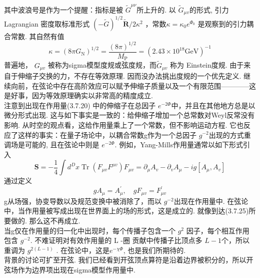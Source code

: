 其中波浪号是作为一个提醒：指标是被 $\tilde{G}^{\mu \nu}$所上升的. 以 $\tilde{G}_{\mu v}$的形式, 引力 Lagrangian 密度取标准形式  $(-\tilde{G})^{1 / 2} \tilde{\boldsymbol{R}} / 2 \kappa^{2} $ ，常数$\kappa=\kappa_{0} e^{\Phi_{0}}$ 是观察到的引力耦合常数.
其自然有值
\begin{equation}
\kappa=\left(8 \pi G_{\mathrm{N}}\right)^{1 / 2}=\frac{(8 \pi)^{1 / 2}}{M_{\mathrm{P}}}=\left(2.43 \times 10^{18} \mathrm{GeV}\right)^{-1}
\end{equation}
普遍地， $G_{\mu v}$ 被称为sigma模型度规或弦度规，而$\tilde{G}_{\mu v}$ 称为 Einstein度规. 由于来自于伸缩子交换的力，不存在等效原理. 因而没办法挑出度规的一个优先定义. 继续向前，在弦论中存在高阶效应可以赋予伸缩子质量以及一个有限范围————这是好事，因为等效原理确实以非常高的精度成立.\\
注意到出现在作用量(3.7.20) 中的伸缩子在总因子 $e^{-2 \Phi}$中，并且在其他地方总是以微分形式出现. 这与如下事实是一致的：给伸缩子增加一个总常数对Weyl反常没有影响. 从时空的观点看，这给作用量乘上了一个常数，但不影响运动方程. 它也反应了这样的事实：在量子场论中，以耦合常数g作为一个总因子 $g^{-2}$出现的方式重调场是可能的, 且在弦论中则是 $e^{-2 \Phi}$. 例如，Yang-Mills作用量通常以如下形式引入
\begin{subequations}
\begin{equation}
\boldsymbol{S}=-\frac{1}{4} \int d^{D} x \operatorname{Tr}\left(F_{\mu v} F^{\mu v}\right)
\end{equation}
\begin{equation}
F_{\mu v}=\partial_{\mu} A_{v}-\partial_{v} A_{\mu}-i g\left[A_{\mu}, A_{v}\right]
\end{equation}
\end{subequations}
通过定义
\begin{equation}
g A_{\mu}=A_{\mu}^{\prime}, \quad g F_{\mu v}=F_{\mu v}^{\prime}
\end{equation}
g从场强，协变导数以及规范变换中被消除了，而以 $g^{-2}$出现在作用量中. 在弦论中，当作用量被写成出现在世界面上的场的形式，这是成立的.  就像到达(3.7.25)所要做的. 那么这不再成立.\\
当g仅在作用量的归一化中出现时，每个传播子包含一个 $g^{2}$ 因子，每个相互作用包含 $g^{-2}$. 不难证明对有效作用量的 L -圈 贡献中传播子比顶点多 $L-1$个，所以重调为  $g^{2(L-1)} $ . 在弦论中，这是$e^{-\chi \Phi}$, 也是我们所期待的.\\
背景的讨论可扩至开弦. 我们已经看到开弦顶点算符是沿着边界被积分的，所以开弦场作为边界项出现在sigma模型作用量中.
\\

